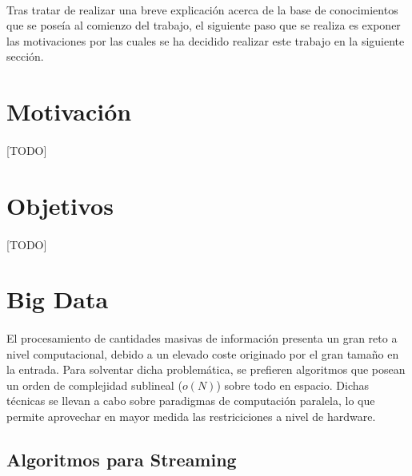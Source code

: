 \documentclass{subfiles}
\begin{document}
      \paragraph{}
      Tras tratar de realizar una breve explicación acerca de la base de conocimientos que se poseía al comienzo del trabajo, el siguiente paso que se realiza es exponer las motivaciones por las cuales se ha decidido realizar este trabajo en la siguiente sección.

    \section{Motivación}
    \label{sec:introduction_motivation}

      \paragraph{}
      [TODO]


    \section{Objetivos}
    \label{sec:introduction_goals}

      \paragraph{}
      [TODO]

    \section{Big Data}
    \label{sec:introduction_big_data}

      \paragraph{}
      El procesamiento de cantidades masivas de información presenta un gran reto a nivel computacional, debido a un elevado coste originado por el gran tamaño en la entrada. Para solventar dicha problemática, se prefieren algoritmos que posean un orden de complejidad sublineal ($o(N)$) sobre todo en espacio. Dichas técnicas se llevan a cabo sobre paradigmas de computación paralela, lo que permite aprovechar en mayor medida las restriciciones a nivel de hardware.

      \subsection{Algoritmos para Streaming}
\end{document}
